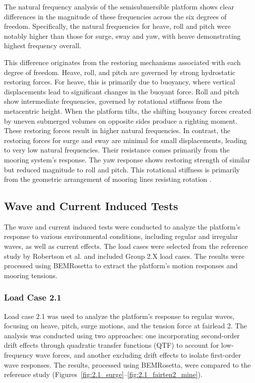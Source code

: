 \documentclass[a4paper, 11pt]{article}
\begin{document}
The natural frequency analysis of the semisubmersible platform shows clear differences in the magnitude of these frequencies across the six degrees of freedom. Specifically, the natural frequencies for heave, roll and pitch were notably higher than those for surge, sway and yaw, with heave demonstrating highest frequency overall.

This difference originates from the restoring mechanisms associated with each degree of freedom. Heave, roll, and pitch are governed by strong hydrostatic restoring forces. For heave, this is primarily due to buoyancy, where vertical displacements lead to significant changes in the buoyant force. Roll and pitch show intermediate frequencies, governed by rotational stiffness from the metacentric height. When the platform tilts, the shifting bouyancy forces created by uneven submerged volumes on opposite sides produce a righting moment. These restoring forces result in higher natural frequencies. In contrast, the restoring forces for surge and sway are minimal for small displacements, leading to very low natural frequencies. Their resistance comes primarily from the mooring system's response. The yaw response shows restoring strength of similar but reduced magnitude to roll and pitch. This rotational stiffness is primarily from the geometric arrangement of mooring lines resisting rotation \cite{metacenter}.


\subsection{Wave and Current Induced Tests}
\hspace*{0.5cm}The wave and current induced tests were conducted to analyze the platform's response to various environmental conditions, including regular and irregular waves, as well as current effects. The load cases were selected from the reference study by Robertson et al. \cite{Robertson2014} and included Group 2.X load cases. The results were processed using BEMRosetta to extract the platform's motion responses and mooring tensions.

\subsubsection{Load Case 2.1}

\hspace{0.5cm}Load case 2.1 was used to analyze the platform’s response to regular waves, focusing on heave, pitch, surge motions, and the tension force at fairlead 2. The analysis was conducted using two approaches: one incorporating second-order drift effects through quadratic transfer functions (QTF) to account for low-frequency wave forces, and another excluding drift effects to isolate first-order wave responses. The results, processed using BEMRosetta, were compared to the reference study (Figures~\ref{fig:2.1_surge}--\ref{fig:2.1_fairten2_mine}).
\end{document}
